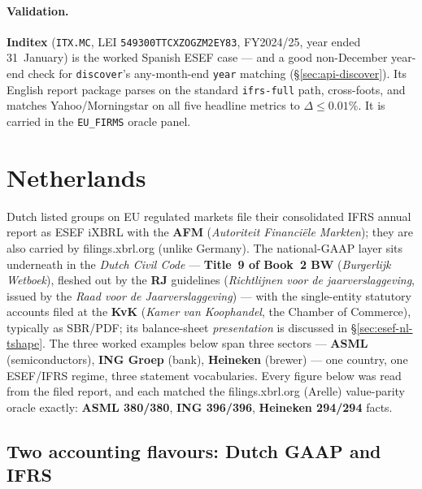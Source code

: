 \documentclass[11pt,a4paper]{report}
\begin{document}
\paragraph{Validation.} \textbf{Inditex} (\texttt{ITX.MC}, LEI \texttt{549300TTCXZOGZM2EY83}, FY2024/25, year
ended 31~January) is the worked Spanish ESEF case --- and a good non-December year-end check for
\texttt{discover}'s any-month-end \texttt{year} matching (\S\ref{sec:api-discover}). Its English report package
parses on the standard \texttt{ifrs-full} path, cross-foots, and matches Yahoo/Morningstar on all five headline
metrics to \(\Delta\le 0.01\%\). It is carried in the \texttt{EU\_FIRMS} oracle panel.

\section{Netherlands}
\label{sec:esef-nl}

Dutch listed groups on EU regulated markets file their consolidated IFRS annual report as ESEF iXBRL with the
\textbf{AFM} (\emph{Autoriteit Financi\"ele Markten}); they are also carried by filings.xbrl.org (unlike
Germany). The national-GAAP layer sits underneath in the \emph{Dutch Civil Code} --- \textbf{Title~9 of
Book~2 BW} (\emph{Burgerlijk Wetboek}), fleshed out by the \textbf{RJ} guidelines (\emph{Richtlijnen voor de
jaarverslaggeving}, issued by the \emph{Raad voor de Jaarverslaggeving}) --- with the single-entity statutory
accounts filed at the \textbf{KvK} (\emph{Kamer van Koophandel}, the Chamber of Commerce), typically as SBR/PDF;
its balance-sheet \emph{presentation} is discussed in \S\ref{sec:esef-nl-tshape}. The three worked examples
below span three sectors --- \textbf{ASML} (semiconductors), \textbf{ING Groep} (bank), \textbf{Heineken}
(brewer) --- one country, one ESEF/IFRS regime, three statement vocabularies. Every figure below was read from
the filed report, and each matched the filings.xbrl.org (Arelle) value-parity oracle exactly: \textbf{ASML
380/380}, \textbf{ING 396/396}, \textbf{Heineken 294/294} facts.

\subsection{Two accounting flavours: Dutch GAAP and IFRS}
\end{document}
